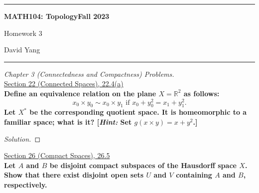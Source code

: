 \documentclass[11pt]{article}
\newcommand{\R}{\mathbb{R}}
\newenvironment{solution}
  {\renewcommand\qedsymbol{$\blacksquare$}\begin{proof}[Solution]}
  {\end{proof}}
\begin{document}
	\hrule
	\begin{center}
        \textbf{MATH104: Topology}\hfill \textbf{Fall 2023}\newline

		{\Large Homework 3}

		David Yang
	\end{center}

\hrule

\vspace{1em}

\textit{Chapter 3 (Connectedness and Compactness) Problems.} \\

\underline{Section 22 (Connected Spaces), 22.4(a)} \\

\textbf{Define an equivalence relation on the plane $X = \R^2$ as follows:}
\[
	x_0 \times y_0 \sim x_0 \times y_1 \text{ if } x_0 + y_0^2 = x_1 + y_1^2.
\]
\textbf{Let $X^*$ be the corresponding quotient space. It is homeomorphic to a familiar space; what is it?
[\textit{Hint:} Set $g(x \times y) = x + y^2$.]} \\

\begin{solution}

\end{solution}

\newpage

\underline{Section 26 (Compact Spaces), 26.5} \\

\textbf{Let $A$ and $B$ be disjoint compact subspaces of the Hausdorff space $X$. Show that there exist disjoint
open sets $U$ and $V$ containing $A$ and $B$, respectively.} \\
\end{document}
